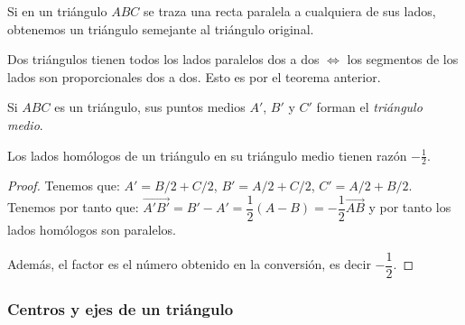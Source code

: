 \begin{ncor}
  Si en un triángulo $ABC$ se traza una recta paralela a cualquiera de sus lados, obtenemos un triángulo semejante al triángulo original.
\end{ncor}

\begin{nota}
  Dos triángulos tienen todos los lados paralelos dos a dos $\iff$ los segmentos de los lados son proporcionales dos a dos. Esto es por el teorema anterior.
\end{nota}

\begin{ndef}
  Si $ABC$ es un triángulo, sus puntos medios $A'$, $B'$ y $C'$ forman el \textit{triángulo medio}.
\end{ndef}

\begin{nprop}
  Los lados homólogos de un triángulo en su triángulo medio tienen razón $-\frac{1}{2}$.
\end{nprop}

\begin{proof}
  Tenemos que: $A' = B/2 + C/2$, $B' = A/2+C/2$, $C' = A/2 + B/2$. Tenemos por tanto que: $\vec{A'B'} = B'-A' = \dfrac{1}{2}(A-B) = -\dfrac{1}{2} \vec{AB}$ y por tanto los lados homólogos son paralelos.

      Además, el factor es el número obtenido en la conversión, es decir $-\dfrac{1}{2}$.
\end{proof}

\subsubsection{Centros y ejes de un triángulo}

